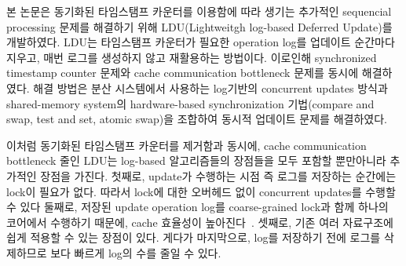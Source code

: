 %
\ifkor
본 논문은 동기화된 타임스탬프 카운터를 이용함에 따라 생기는 추가적인 sequencial processing 문제를
해결하기 위해 LDU(Lightweitgh log-based Deferred Update)를 개발하였다. 
LDU는 타임스탬프 카운터가 필요한 operation log를 업데이트 순간마다 지우고, 매번 로그를 생성하지 않고 재활용하는 방법이다.
이로인해 synchronized timestamp counter 문제와 cache communication bottleneck 문제를 동시에
해결하였다.
해결 방법은 분산 시스템에서 사용하는 log기반의 concurrent updates 방식과 shared-memory system의 
hardware-based synchronization 기법(compare and swap, test and
set, atomic swap)을 조합하여 동시적 업데이트 문제를 해결하였다.
\else
\fi

\ifkor
이처럼 동기화된 타임스탬프 카운터를 제거함과 동시에, cache communication bottleneck 줄인
LDU는 log-based 알고리즘들의 장점들을 모두 포함할 뿐만아니라 추가적인 장점을 가진다.
첫째로, update가 수행하는 시점 즉 로그를 저장하는 순간에는 lock이 필요가 없다. 
따라서 lock에 대한 오버헤드 없이 concurrent updates를 수행할 수 있다
둘째로, 저장된 update operation log를 coarse-grained lock과 함께 하나의 코어에서 수행하기 때문에,
cache 효율성이 높아진다~\cite{Hendler2010FC}.
셋째로, 기존 여러 자료구조에 쉽게 적용할 수 있는 장점이 있다.
게다가 마지막으로, log를 저장하기 전에 로그를 삭제하므로 보다 빠르게 log의 수를 줄일 수 있다. 
\else
\fi

